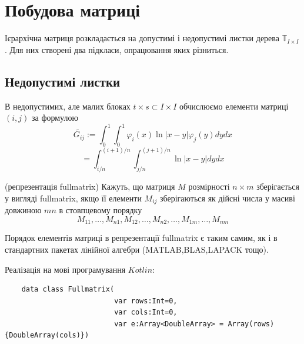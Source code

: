 \documentclass[12pt]{report}
\begin{document}
	\section{Побудова матриці}
	\hspace{0.8cm} Ієрархічна матриця розкладається на допустимі і недопустимі листки дерева $\mathbb{T}_{I\times I}$. Для них створені два підкласи, опрацювання яких різниться.
	\subsection{Недопустимі листки}
	\hspace{0.8cm} В недопустимих, але малих блоках $t\times s\subset I\times I$ обчислюємо елементи матриці $(i,j)$ за формулою
	$$\tilde{G_{ij}}:=\int_{0}^{1}\int_{0}^{1}\varphi_i(x)\ln|x-y|\varphi_j(y)dydx$$$$=\int_{i/n}^{(i+1)/n}\int_{j/n}^{(j+1)/n}\ln|x-y|dydx$$
	\begin{Def}
		(репрезентація fullmatrix) Кажуть, що матриця $M$ розмірності $n\times m$ зберігається у вигляді fullmatrix, якщо її елементи $M_{ij}$ зберігаються як дійсні числа у масиві довжиною $mn$ в стовпцевому порядку
		$$M_{11},\dots,M_{n1},M_{12},\dots,M_{n2},\dots,M_{1m},\dots,M_{nm}$$
	\end{Def}
	\par Порядок елементів матриці в репрезентації fullmatrix є таким самим, як і в стандартних пакетах лінійної алгебри (MATLAB,BLAS,LAPACK тощо).
	\par Реалізація на мові програмування $Kotlin$:
	\begin{verbatim}
	data class Fullmatrix(
						  var rows:Int=0,
						  var cols:Int=0,
						  var e:Array<DoubleArray> = Array(rows){DoubleArray(cols)})
	\end{verbatim}
\end{document}
